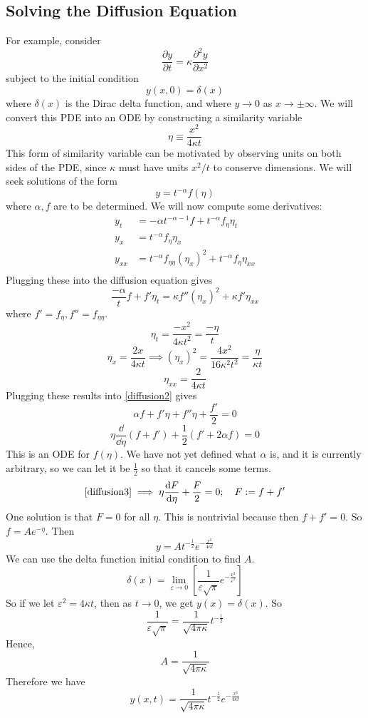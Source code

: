 \documentclass{article}
\begin{document}
	\subsection{Solving the Diffusion Equation}
	For example, consider
	\[ \frac{\partial y}{\partial t} = \kappa \frac{\partial^2 y}{\partial x^2} \]
	subject to the initial condition
	\[ y(x, 0) = \delta(x) \]
	where $\delta(x)$ is the Dirac delta function, and where $y \to 0$ as $x \to \pm \infty$. We will convert this PDE into an ODE by constructing a similarity variable
	\[ \eta \equiv \frac{x^2}{4\kappa t} \]
	This form of similarity variable can be motivated by observing units on both sides of the PDE, since $\kappa$ must have units $x^2/t$ to conserve dimensions. We will seek solutions of the form
	\[ y=t^{-\alpha}f(\eta) \]
	where $\alpha, f$ are to be determined. We will now compute some derivatives:
	\begin{align*}
		y_t &= -\alpha t^{-\alpha-1}f + t^{-\alpha} f_\eta \eta_t \\
		y_x &= t^{-\alpha}f_\eta \eta_x \\
		y_{xx} &= t^{-\alpha}f_{\eta\eta} (\eta_x)^2 + t^{-\alpha}f_\eta \eta_{xx} \\
	\end{align*}
	Plugging these into the diffusion equation gives
	\begin{equation}\label{diffusion2}
		\frac{-\alpha}{t}f + f'\eta_t = \kappa f''(\eta_{x})^2 + \kappa f' \eta_{xx}
	\end{equation}
	where $f'=f_\eta, f''=f_{\eta\eta}$.
	\[ \eta_t = \frac{-x^2}{4\kappa t^2} = \frac{-\eta}{t} \]
	\[ \eta_x = \frac{2x}{4\kappa t} \implies (\eta_x)^2 = \frac{4x^2}{16\kappa^2t^2} = \frac{\eta}{\kappa t} \]
	\[ \eta_{xx} = \frac{2}{4\kappa t} \]
	Plugging these results into \eqref{diffusion2} gives
	\[ \alpha f + f' \eta + f'' \eta + \frac{f'}{2} = 0 \]
	\begin{equation}\label{diffusion3}
		\eta \frac{\dd}{\dd \eta}(f + f') + \frac{1}{2}(f' + 2\alpha f) = 0
	\end{equation}
	This is an ODE for $f(\eta)$. We have not yet defined what $\alpha$ is, and it is currently arbitrary, so we can let it be $\frac{1}{2}$ so that it cancels some terms.
	\[ \eqref{diffusion3} \implies \eta \frac{\dd F}{\dd \eta} + \frac{F}{2} = 0;\quad F := f+f' \]
	One solution is that $F = 0$ for all $\eta$. This is nontrivial because then $f + f' = 0$. So $f = Ae^{-\eta}$. Then
	\[ y = At^{-\frac{1}{2}}e^{-\frac{x^2}{4\kappa t}} \]
	We can use the delta function initial condition to find $A$.
	\[ \delta(x) = \lim_{\varepsilon \to 0} \left[ \frac{1}{\varepsilon\sqrt \pi} e^{-\frac{x^2}{\varepsilon^2}} \right] \]
	So if we let $\varepsilon^2 = 4\kappa t$, then as $t \to 0$, we get $y(x) = \delta(x)$. So
	\[ \frac{1}{\varepsilon\sqrt \pi} = \frac{1}{\sqrt{4 \pi \kappa}} t^{-\frac{1}{2}} \]
	Hence,
	\[ A = \frac{1}{\sqrt{4 \pi \kappa}} \]
	Therefore we have
	\[ y(x, t) = \frac{1}{\sqrt{4 \pi \kappa}} t^{-\frac{1}{2}} e^{-\frac{x^2}{4\kappa t}} \]
\end{document}
